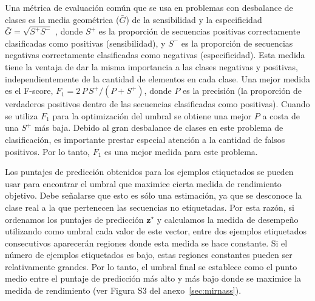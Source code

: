 Una métrica de evaluación común que se usa en problemas con desbalance de clases es la media geométrica ($ \bar {G} $) de la sensibilidad y la especificidad $
\bar {G} = \sqrt {S ^ {+} S ^ {-} } $ \citep{batuwita2009micropred, gudys2013huntmi}, donde $ S ^ {+} $ es la proporción de secuencias positivas correctamente
clasificadas como positivas (sensibilidad), y $ S ^ {-} $ es la proporción de secuencias negativas correctamente clasificadas como negativas (especificidad).
Esta medida tiene la ventaja de dar la misma importancia a las clases negativas y positivas, independientemente de la cantidad de elementos en cada clase. Una
mejor medida es el \mbox{F-score}, $ F_ {1} = 2 \, P \, S ^ {+} / (P + S ^ {+}) $, donde $ P $ es la precisión (la proporción de verdaderos positivos dentro de
las secuencias clasificadas como positivas). Cuando se utiliza $ F_ {1} $ para la optimización del umbral se obtiene una mejor $ P $ a costa de una $ S ^ {+} $
más baja. Debido al gran desbalance de clases en este problema de clasificación, es importante prestar especial atención a la cantidad de falsos positivos. Por
lo tanto, $F_{1}$ es una mejor medida para este problema.

Los puntajes de predicción obtenidos para los ejemplos etiquetados se pueden usar para encontrar el umbral que maximice cierta medida de rendimiento objetivo.
Debe señalarse que esto es sólo una estimación, ya que se desconoce la clase real a la que pertenecen las secuencias no etiquetadas. Por esta razón, si
ordenamos los puntajes de predicción $ \mathbf {z} ^ \star $ y calculamos la medida de desempeño utilizando como umbral cada valor de este vector,  entre dos
ejemplos etiquetados consecutivos aparecerán regiones donde esta medida se hace constante. Si el número de ejemplos etiquetados es bajo, estas regiones
constantes pueden ser relativamente grandes. Por lo tanto, el umbral final se establece como el punto medio entre el puntaje de predicción más alto y más
bajo  donde se maximice la medida de rendimiento (ver Figura S3 del anexo~\ref{sec:mirnass}).
